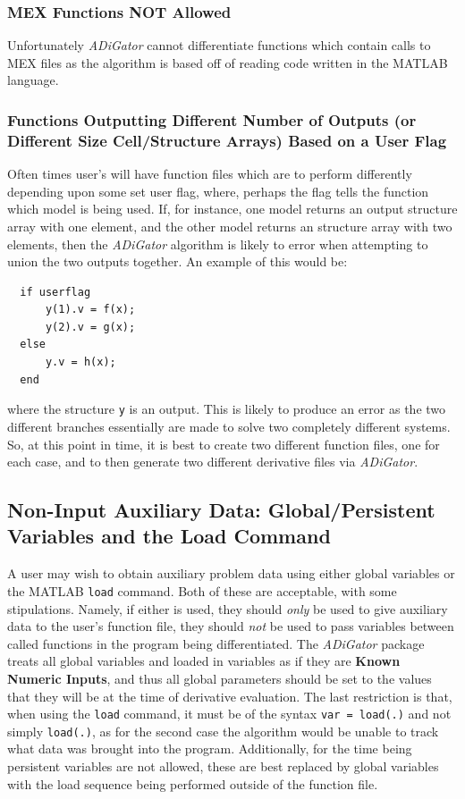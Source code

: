 \documentclass[10pt,pdftex]{article}
\begin{document}
\subsubsection{MEX Functions NOT Allowed}
Unfortunately {\em ADiGator} cannot differentiate functions which contain calls to MEX files as 
the algorithm is based off of reading code written in the MATLAB language.
\subsubsection{Functions Outputting Different Number of Outputs (or Different Size Cell/Structure Arrays) Based on a User Flag}
Often times user's will have function files which are to perform differently depending upon some set user flag, where, perhaps the flag tells the function which model is being used. If, for instance, one model returns an output structure array with one element, and the other model returns an structure array with two elements, then the {\em ADiGator} algorithm is likely to error when attempting to union the two outputs together. An example of this would be:
\begin{verbatim}
  if userflag
      y(1).v = f(x);
      y(2).v = g(x);
  else
      y.v = h(x);
  end
\end{verbatim}
where the structure \texttt{y} is an output. This is likely to produce an error as the two different branches essentially are made to solve two completely different systems. So, at this point in time, it is best to create two different function files, one for each case, and to then generate two different derivative files via {\em ADiGator}.

\subsection{Non-Input Auxiliary Data: Global/Persistent Variables and the Load Command}
A user may wish to obtain auxiliary problem data using either global variables or the MATLAB \texttt{load} command. Both of these are acceptable, with some stipulations. Namely, if either is used, they should \emph{only} be used to give auxiliary data to the user's function file, they should \emph{not} be used to pass variables between called functions in the program being differentiated. The \emph{ADiGator} package treats all global variables and loaded in variables as if they are {\bf Known Numeric Inputs}, and thus all global parameters should be set to the values that they will be at the time of derivative evaluation. The last restriction is that, when using the \texttt{load} command, it must be of the syntax \texttt{var = load(.)} and not simply \texttt{load(.)}, as for the second case the algorithm would be unable to track what data was brought into the program.
Additionally, for the time being persistent variables are not allowed, these are best replaced by global variables with the load sequence being performed outside of the function file.
\end{document}
